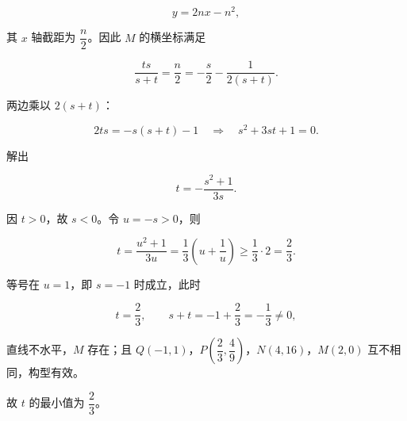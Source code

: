 \begin{answer}
\nopagebreak[4]
\[y=2nx-n^2,\]

其 $x$ 轴截距为 $\dfrac n2$。因此 $M$ 的横坐标满足

\nopagebreak[4]
\[\frac{ts}{s+t}=\frac n2
=-\frac s2-\frac1{2(s+t)}.\]

两边乘以 $2(s+t)$：

\nopagebreak[4]
\[2ts=-s(s+t)-1
\quad\Longrightarrow\quad
s^2+3st+1=0.\]

解出

\nopagebreak[4]
\[t=-\frac{s^2+1}{3s}.\]

因 $t>0$，故 $s<0$。令 $u=-s>0$，则

\nopagebreak[4]
\[t=\frac{u^2+1}{3u}
=\frac13\left(u+\frac1u\right)
\geqslant\frac13\cdot2=\frac23.\]

等号在 $u=1$，即 $s=-1$ 时成立，此时

\nopagebreak[4]
\[t=\frac23,\qquad s+t=-1+\frac23=-\frac13\neq0,\]

直线不水平，$M$ 存在；且 $Q(-1,1)$，$P\left(\dfrac23,\dfrac49\right)$，$N(4,16)$，$M(2,0)$ 互不相同，构型有效。

故 $t$ 的最小值为 $\dfrac23$。


\end{answer}